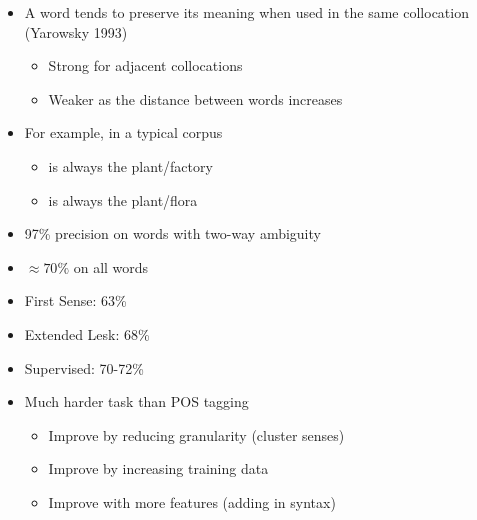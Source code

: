 \documentclass[a4paper,landscape,headrule,footrule,xetex]{foils}
\begin{document}
\begin{itemize}
\item A word tends to preserve its meaning when used in the same collocation (Yarowsky 1993)
  \begin{itemize}
  \item Strong for adjacent collocations
  \item Weaker as the distance between words increases
  \end{itemize}

\item For example, in a typical corpus
  \begin{itemize}
  \item {} is always the plant/factory
  \item {} is always the plant/flora
  \end{itemize}
\item 97\% precision on words with two-way ambiguity
\item $\approx 70\%$ on all words
\end{itemize}


\begin{itemize}
\item First Sense: 63\% 
\item Extended Lesk:  68\%
\item Supervised: 70-72\% 
\item Much harder task than POS tagging
  \begin{itemize}
  \item Improve by reducing granularity (cluster senses)
  \item Improve by increasing training data
  \item Improve with more features (adding in syntax)
  \end{itemize}
\end{itemize}


\end{document}
